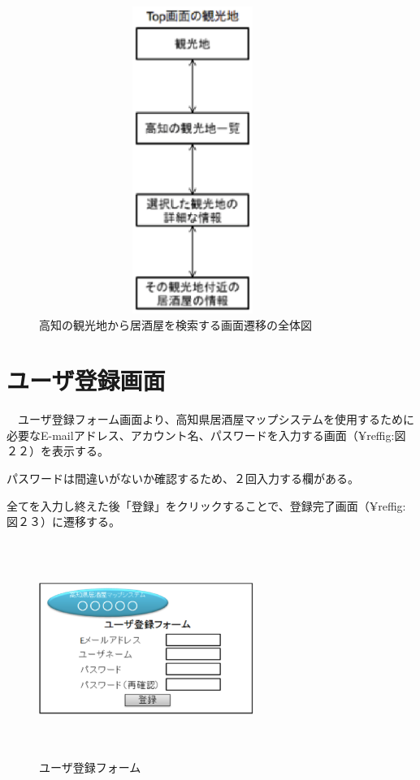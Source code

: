 \documentclass[a4j,titlepage]{jarticle}
\begin{document}
\begin {figure}[!htbp]
    \begin{center}
    \includegraphics [height=10cm, width=10cm]{21.eps}
    \caption {高知の観光地から居酒屋を検索する画面遷移の全体図}
    \label {fig:21}
    \end{center}
\end {figure}

\clearpage

\section{ユーザ登録画面}
　ユーザ登録フォーム画面より、高知県居酒屋マップシステムを使用するために必要なE-mailアドレス、アカウント名、パスワードを入力する画面（¥ref{fig:図２２}）を表示する。



パスワードは間違いがないか確認するため、２回入力する欄がある。



全てを入力し終えた後「登録」をクリックすることで、登録完了画面（¥ref{fig:図２３}）に遷移する。




\begin {figure}[!htbp]
    \begin{center}
    \includegraphics [height=7cm, width=7cm]{22.eps}
    \caption {ユーザ登録フォーム}
    \label {fig:22}
    \end{center}
\end {figure}
\end{document}
